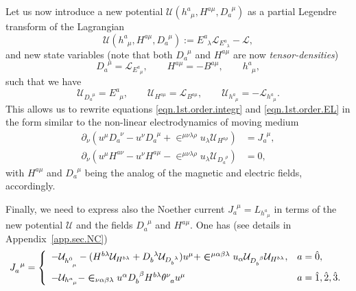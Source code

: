 \documentclass[
10pt, %
a4paper, %
oneside, %
headinclude,footinclude, %
BCOR5mm, %
]{scrartcl}
\newcommand{\tetrsymbol}{h}
\newcommand{\itetrsymbol}{\theta}
\newcommand{\itetr}[2]{\itetrsymbol^{#1}_{\phantom{#1}#2}}
\newcommand{\tetr}[2]{\tetrsymbol^{#1}_{\phantom{#1}#2}}
\newcommand{\D}[1]{\partial_{#1}} %
\newcommand{\ET}[2]{E^{#1}_{\phantom{#1}#2}}	%
\newcommand{\eT}[2]{D_{#1}^{\phantom{#1}#2}}	%
\newcommand{\BT}[2]{B^{#1#2}}	%
\newcommand{\hT}[2]{H^{#1#2}}	%
\newcommand{\Laghodge}{L}%
\newcommand{\LagBE}{\mathcal{L}}%
\newcommand{\LagST}{\mathcal{U}}%
\newcommand{\LCsymb}{\bm{\in}}    %
\newcommand{\NC}[2]{J^{\phantom{#1}#2}_{#1}}
\newcommand{\indlat}[1]{\hat{\mathsmaller{#1}}}
\begin{document}
Let us now introduce a new potential $ \LagST(\tetr{a}{\mu},\hT{a}{\mu},\eT{a}{\mu}) $ as a partial 
Legendre transform of the Lagrangian
\begin{equation}\label{eqn.Legandre1}
 \LagST(\tetr{a}{\mu},\hT{a}{\mu},\eT{a}{\mu}) := \ET{a}{\lambda}\LagBE_{\ET{a}{\lambda}} - \LagBE,
\end{equation}
and new state variables (note that both $ \eT{a}{\mu} $ and $ \hT{a}{\mu} $ are now 
\emph{tensor-densities})
\begin{equation}\label{eqn.Legandre2}
\eT{a}{\mu} = \LagBE_{\ET{a}{\mu}}, \qquad \hT{a}{\mu} = -\BT{a}{\mu}, \qquad \tetr{a}{\mu},
\end{equation}
such that we have
\begin{equation}\label{eqn.Legandre3}
\LagST_{\eT{a}{\mu}} = \ET{a}{\mu}, \qquad \LagST_{\hT{a}{\mu}} = \LagBE_{\BT{a}{\mu}},
\qquad \LagST_{\tetr{a}{\mu}} = - \LagBE_{\tetr{a}{\mu}}.
\end{equation}
This allows us to rewrite equations \eqref{eqn.1st.order.integr} and \eqref{eqn.1st.order.EL} in 
the form similar to the non-linear 
electrodynamics of moving medium~\cite{Obukhov2008,DPRZ2017,Hohmann2018a}
\begin{subequations}
	\begin{align}
		\D{\nu}(u^\mu\eT{a}{\nu} - u^\nu \eT{a}{\mu} + 
		\LCsymb^{\mu\nu\lambda\rho}u_\lambda 
		\LagST_{\hT{a}{\rho}})
		& =	\NC{a}{\mu},\\[2mm]
		\D{\nu}(u^\mu \hT{a}{\nu} - u^\nu \hT{a}{\mu} - 
		\LCsymb^{\mu\nu\lambda\rho}u_\lambda 
		\LagST_{\eT{a}{\rho}}) 
		& = 0,
\end{align}
\end{subequations}
with $\hT{a}{\mu}$ and $\eT{a}{\mu}$ being the analog of the magnetic and electric fields, 
accordingly.


Finally, we need to express also the Noether current $ \NC{a}{\mu} = \Laghodge_{\tetr{a}{\mu}} $ in 
terms of the 
new potential $ \LagST $ and the fields $ \eT{a}{\mu} $ and $ \hT{a}{\mu} $. One has (see details 
in Appendix~\ref{app.sec.NC})
\begin{equation}\label{eqn.J}
	\NC{a}{\mu} = \left\{
	\begin{array}{ll}
	-\LagST_{\tetr{\indlat{0}}{\mu}} 
	- (\hT{b}{\lambda} \LagST_{\hT{b}{\lambda}} 
	+ \eT{b}{\lambda} \LagST_{\eT{b}{\lambda}} )u^\mu
	+ \LCsymb^{\mu\alpha\beta\lambda} u_\alpha 
	\LagST_{\eT{b}{\beta}} \LagST_{\hT{b}{\lambda}},	& a=\hat{0},  \\[3mm] 
	-\LagST_{\tetr{a}{\mu}}	
	- \LCsymb_{\nu\alpha\beta\lambda}u^\alpha\eT{b}{\beta}\hT{b}{\lambda}\itetr{\nu}{a}u^\mu & a = 
	\hat{1},\hat{2},\hat{3}. \\ 
	\end{array} 
	\right.
\end{equation}
\end{document}
